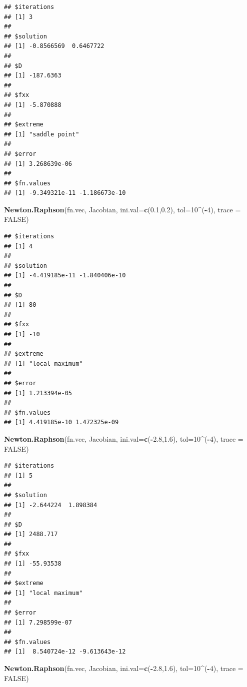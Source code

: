 \documentclass[
]{book}
\newenvironment{Shaded}{\begin{snugshade}}{\end{snugshade}}
\newcommand{\AttributeTok}[1]{\textcolor[rgb]{0.13,0.29,0.53}{#1}}
\newcommand{\ConstantTok}[1]{\textcolor[rgb]{0.56,0.35,0.01}{#1}}
\newcommand{\DecValTok}[1]{\textcolor[rgb]{0.00,0.00,0.81}{#1}}
\newcommand{\FloatTok}[1]{\textcolor[rgb]{0.00,0.00,0.81}{#1}}
\newcommand{\FunctionTok}[1]{\textcolor[rgb]{0.13,0.29,0.53}{\textbf{#1}}}
\newcommand{\NormalTok}[1]{#1}
\newcommand{\SpecialCharTok}[1]{\textcolor[rgb]{0.81,0.36,0.00}{\textbf{#1}}}
\begin{document}
\begin{verbatim}
## $iterations
## [1] 3
## 
## $solution
## [1] -0.8566569  0.6467722
## 
## $D
## [1] -187.6363
## 
## $fxx
## [1] -5.870888
## 
## $extreme
## [1] "saddle point"
## 
## $error
## [1] 3.268639e-06
## 
## $fn.values
## [1] -9.349321e-11 -1.186673e-10
\end{verbatim}

\begin{Shaded}
\begin{Highlighting}[]
\FunctionTok{Newton.Raphson}\NormalTok{(fn.vec, Jacobian, }\AttributeTok{ini.val=}\FunctionTok{c}\NormalTok{(}\FloatTok{0.1}\NormalTok{,}\FloatTok{0.2}\NormalTok{), }\AttributeTok{tol=}\DecValTok{10}\SpecialCharTok{\^{}}\NormalTok{(}\SpecialCharTok{{-}}\DecValTok{4}\NormalTok{), }\AttributeTok{trace =} \ConstantTok{FALSE}\NormalTok{)}
\end{Highlighting}
\end{Shaded}

\begin{verbatim}
## $iterations
## [1] 4
## 
## $solution
## [1] -4.419185e-11 -1.840406e-10
## 
## $D
## [1] 80
## 
## $fxx
## [1] -10
## 
## $extreme
## [1] "local maximum"
## 
## $error
## [1] 1.213394e-05
## 
## $fn.values
## [1] 4.419185e-10 1.472325e-09
\end{verbatim}

\begin{Shaded}
\begin{Highlighting}[]
\FunctionTok{Newton.Raphson}\NormalTok{(fn.vec, Jacobian, }\AttributeTok{ini.val=}\FunctionTok{c}\NormalTok{(}\SpecialCharTok{{-}}\FloatTok{2.8}\NormalTok{,}\FloatTok{1.6}\NormalTok{), }\AttributeTok{tol=}\DecValTok{10}\SpecialCharTok{\^{}}\NormalTok{(}\SpecialCharTok{{-}}\DecValTok{4}\NormalTok{), }\AttributeTok{trace =} \ConstantTok{FALSE}\NormalTok{)}
\end{Highlighting}
\end{Shaded}

\begin{verbatim}
## $iterations
## [1] 5
## 
## $solution
## [1] -2.644224  1.898384
## 
## $D
## [1] 2488.717
## 
## $fxx
## [1] -55.93538
## 
## $extreme
## [1] "local maximum"
## 
## $error
## [1] 7.298599e-07
## 
## $fn.values
## [1]  8.540724e-12 -9.613643e-12
\end{verbatim}

\begin{Shaded}
\begin{Highlighting}[]
\FunctionTok{Newton.Raphson}\NormalTok{(fn.vec, Jacobian, }\AttributeTok{ini.val=}\FunctionTok{c}\NormalTok{(}\SpecialCharTok{{-}}\FloatTok{2.8}\NormalTok{,}\FloatTok{1.6}\NormalTok{), }\AttributeTok{tol=}\DecValTok{10}\SpecialCharTok{\^{}}\NormalTok{(}\SpecialCharTok{{-}}\DecValTok{4}\NormalTok{), }\AttributeTok{trace =} \ConstantTok{FALSE}\NormalTok{)}
\end{Highlighting}
\end{Shaded}
\end{document}
